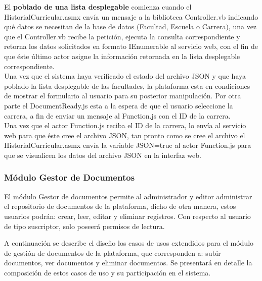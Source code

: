 		
		
	
		El   \textbf{poblado de una lista desplegable} comienza cuando el HistorialCurricular.asmx  envía un mensaje a  la  \label{Proceso_poblado_DDL} biblioteca Controller.vb indicando qué datos se necesitan de la base de datos (Facultad, Escuela o Carrera), una vez que el Controller.vb recibe la petición, ejecuta  la consulta correspondiente y  retorna los datos solicitados en formato IEnumerable al servicio web, con el fin de que éste último actor asigne la información retornada en la lista desplegable correspondiente.
		\\
		
	
		Una vez que  el sistema haya verificado el estado del archivo JSON y que haya poblado la lista desplegable de las facultades, la plataforma esta en condiciones de mostrar el formulario al usuario para su posterior manipulación.		Por otra parte el DocumentReady.js esta a la espera de que el usuario seleccione la carrera, a fin de enviar un mensaje al Function.js con el ID de la carrera.
		\\
		
		Una vez que el actor Function.js reciba el ID de la carrera,  lo envía al servicio web para que éste cree el archivo JSON, tan pronto como se cree el archivo el HistorialCurricular.asmx  envía la variable JSON=true al actor Function.js para que se visualicen los datos del archivo JSON en la interfaz web.
		
		\subsubsection{Módulo Gestor de Documentos}
	
	
		El  módulo Gestor de documentos permite al administrador y editor administrar el repositorio de documentos de la plataforma, dicho de otra manera, estos usuarios podrán: crear, leer, editar y eliminar registros. Con respecto al usuario de tipo suscriptor, solo poseerá permisos de lectura.
	
		
		A continuación se describe el diseño los casos de usos extendidos para el módulo de gestión de documentos de la plataforma, que corresponden a: subir documentos, ver documentos y eliminar documentos. Se presentará en detalle la composición de estos casos de uso y su participación en el sistema.
		
		




